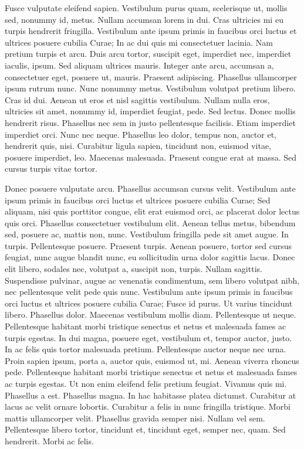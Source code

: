Fusce vulputate eleifend sapien. Vestibulum purus quam, scelerisque ut, mollis sed, nonummy id, metus. Nullam accumsan lorem in dui. Cras ultricies mi eu turpis hendrerit fringilla. Vestibulum ante ipsum primis in faucibus orci luctus et ultrices posuere cubilia Curae; In ac dui quis mi consectetuer lacinia. Nam pretium turpis et arcu. Duis arcu tortor, suscipit eget, imperdiet nec, imperdiet iaculis, ipsum. Sed aliquam ultrices mauris. Integer ante arcu, accumsan a, consectetuer eget, posuere ut, mauris. Praesent adipiscing. Phasellus ullamcorper ipsum rutrum nunc. Nunc nonummy metus. Vestibulum volutpat pretium libero. Cras id dui. Aenean ut eros et nisl sagittis vestibulum. Nullam nulla eros, ultricies sit amet, nonummy id, imperdiet feugiat, pede. Sed lectus. Donec mollis hendrerit risus. Phasellus nec sem in justo pellentesque facilisis. Etiam imperdiet imperdiet orci. Nunc nec neque. Phasellus leo dolor, tempus non, auctor et, hendrerit quis, nisi. Curabitur ligula sapien, tincidunt non, euismod vitae, posuere imperdiet, leo. Maecenas malesuada. Praesent congue erat at massa. Sed cursus turpis vitae tortor. 

Donec posuere vulputate arcu. Phasellus accumsan cursus velit. Vestibulum ante ipsum primis in faucibus orci luctus et ultrices posuere cubilia Curae; Sed aliquam, nisi quis porttitor congue, elit erat euismod orci, ac placerat dolor lectus quis orci. Phasellus consectetuer vestibulum elit. Aenean tellus metus, bibendum sed, posuere ac, mattis non, nunc. Vestibulum fringilla pede sit amet augue. In turpis. Pellentesque posuere. Praesent turpis. Aenean posuere, tortor sed cursus feugiat, nunc augue blandit nunc, eu sollicitudin urna dolor sagittis lacus. Donec elit libero, sodales nec, volutpat a, suscipit non, turpis. Nullam sagittis. Suspendisse pulvinar, augue ac venenatis condimentum, sem libero volutpat nibh, nec pellentesque velit pede quis nunc. Vestibulum ante ipsum primis in faucibus orci luctus et ultrices posuere cubilia Curae; Fusce id purus. Ut varius tincidunt libero. Phasellus dolor. Maecenas vestibulum mollis diam. Pellentesque ut neque. Pellentesque habitant morbi tristique senectus et netus et malesuada fames ac turpis egestas. In dui magna, posuere eget, vestibulum et, tempor auctor, justo. In ac felis quis tortor malesuada pretium. Pellentesque auctor neque nec urna. Proin sapien ipsum, porta a, auctor quis, euismod ut, mi. Aenean viverra rhoncus pede. Pellentesque habitant morbi tristique senectus et netus et malesuada fames ac turpis egestas. Ut non enim eleifend felis pretium feugiat. Vivamus quis mi. Phasellus a est. Phasellus magna. In hac habitasse platea dictumst. Curabitur at lacus ac velit ornare lobortis. Curabitur a felis in nunc fringilla tristique. Morbi mattis ullamcorper velit. Phasellus gravida semper nisi. Nullam vel sem. Pellentesque libero tortor, tincidunt et, tincidunt eget, semper nec, quam. Sed hendrerit. Morbi ac felis.
